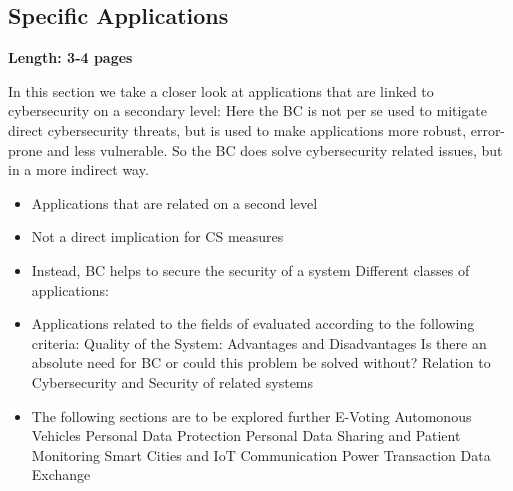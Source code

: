 \subsection{Specific Applications}
\label{subsec:03_applications}

\textbf{Length: 3-4 pages}

In this section we take a closer look at applications that are linked to cybersecurity on a secondary level: Here the BC is not per se used to mitigate direct cybersecurity threats, but is used to make applications more robust, error-prone and less vulnerable. So the BC does solve cybersecurity related issues, but in a more indirect way.

\begin{itemize}
\item Applications that are related on a second level
\item Not a direct implication for CS measures
\item Instead, BC helps to secure the security of a system
Different classes of applications:
\item Applications related to the fields of evaluated according to the following criteria:
\subitem Quality of the System: Advantages and Disadvantages
\subitem Is there an absolute need for BC or could this problem be solved without?
\subitem Relation to Cybersecurity and Security of related systems
\item The following sections are to be explored further
\subitem E-Voting \cite{Osgood2016} \cite{BenAyed2017a}
\subitem Automonous Vehicles \cite{Dorri2017} \cite{Rowan2017a}
\subitem Personal Data Protection \cite{Zyskind2015a}
\subitem Personal Data Sharing and Patient Monitoring \cite{Yue2016a}
\subitem Smart Cities and IoT \cite{Biswas2016a}
\subitem Communication \cite{Rowan2017a}
\subitem Power Transaction
\subitem Data Exchange

\end{itemize}
